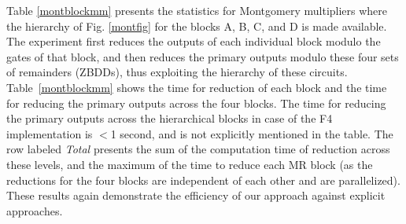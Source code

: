 \par Table \ref{montblockmm} presents the
statistics for Montgomery multipliers where the hierarchy of
Fig. \ref{montfig} for the blocks A, B, C, and D is made
available. The experiment first reduces the outputs of each individual
block modulo the gates of that block, and then reduces the primary
outputs modulo these four sets of remainders (ZBDDs), thus exploiting
the hierarchy of these circuits. Table~\ref{montblockmm} shows the time
for reduction of each block and the time for reducing the primary
outputs across the four blocks. The  time for reducing the primary
outputs across the hierarchical blocks in case of the F4
implementation is $<$1 second, and is not explicitly mentioned in the
table. The row labeled \textit{Total} presents the sum of the
computation time of 
reduction across these levels, and the maximum of the time to reduce
each MR block (as the reductions for the four blocks are independent
of each other and are parallelized). These results again demonstrate
the efficiency of our approach against explicit approaches.

